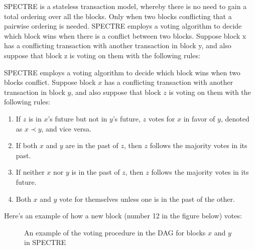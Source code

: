\documentclass[a4paper,11pt]{article}
\begin{document}
SPECTRE is a stateless transaction model, whereby there is no need to gain a total ordering over all the blocks. Only when two blocks conflicting that a pairwise ordering is needed. SPECTRE employs a voting algorithm to decide which block wins when there is a conflict between two blocks. Suppose block x has a conflicting transaction with another transaction in block y, and also suppose that block z is voting on them with the following rules:

SPECTRE employs a voting algorithm to decide which block wins when two blocks
conflict. Suppose block $x$ has a conflicting transaction with another
transaction in block $y$, and also suppose that block $z$ is voting on them with
the following rules:

\begin{enumerate}
	\item If $z$ is in $x$'s future but not in $y$'s future, $z$ votes for
		$x$ in favor of $y$, denoted as $x \prec y$, and vice versa.
	\item If both $x$ and $y$ are in the past of $z$, then $z$ follows the majority votes in its past.
	\item If neither $x$ nor $y$ is in the past of $z$, then $z$ follows the majority votes in its future.
	\item Both $x$ and $y$ vote for themselves unless one is in the past of
		the other.
\end{enumerate}


Here's an example of how a new block (number 12 in the figure below) votes:

\begin{figure}[ht]
	\centerline{%
	}
\caption{An example of the voting procedure in the DAG for blocks $x$ and $y$ in SPECTRE}
\end{figure}
\end{document}
